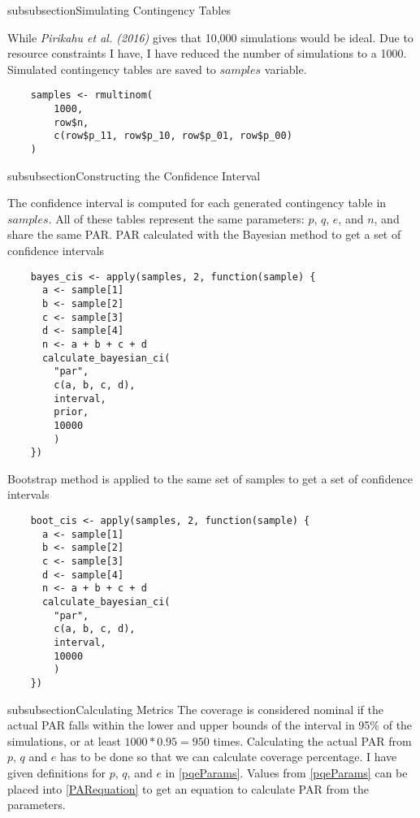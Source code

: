\*subsubsection{Simulating Contingency Tables}

While \textit{Pirikahu et al. (2016)} gives that 10,000 simulations would be ideal. Due to resource constraints I have, I have  reduced the number of simulations to a 1000. Simulated contingency tables are saved to $samples$ variable.

\begin{lstlisting}
    samples <- rmultinom(
        1000,
        row$n, 
        c(row$p_11, row$p_10, row$p_01, row$p_00)
    )
\end{lstlisting}

\*subsubsection{Constructing the Confidence Interval} \label{constructingCI}

The confidence interval is computed for each generated contingency table in $samples$. All of these tables represent the same parameters: $p$, $q$, $e$, and $n$, and share the same PAR. PAR calculated with the Bayesian method to get a set of confidence intervals

\begin{lstlisting}
    bayes_cis <- apply(samples, 2, function(sample) {
      a <- sample[1]
      b <- sample[2]
      c <- sample[3]
      d <- sample[4]
      n <- a + b + c + d
      calculate_bayesian_ci(
        "par",
        c(a, b, c, d),
        interval,
        prior,
        10000
        )
    })
\end{lstlisting}

Bootstrap method is applied to the same set of samples to get a set of confidence intervals

\begin{lstlisting}
    boot_cis <- apply(samples, 2, function(sample) {
      a <- sample[1]
      b <- sample[2]
      c <- sample[3]
      d <- sample[4]
      n <- a + b + c + d
      calculate_bayesian_ci(
        "par",
        c(a, b, c, d),
        interval,
        10000
        )
    })
\end{lstlisting}

\*subsubsection{Calculating Metrics}
The coverage is considered nominal if the actual PAR falls within the lower and upper bounds of the interval in 95\% of the simulations, or at least $1000 * 0.95 = 950$ times. Calculating the actual PAR from $p$, $q$ and $e$ has to be done so that we can calculate coverage percentage. I have given definitions for $p$, $q$, and $e$ in \ref{pqeParams}. Values from \ref{pqeParams} can be placed into \ref{PARequation} to get an equation to calculate PAR from the parameters.

